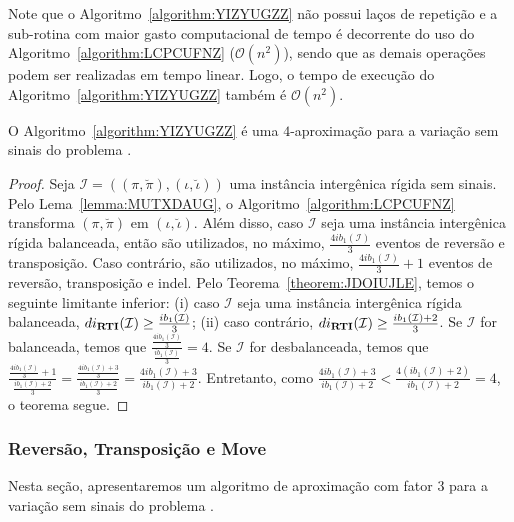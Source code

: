 Note que o Algoritmo~\ref{algorithm:YIZYUGZZ} não possui laços de repetição e a sub-rotina com maior gasto computacional de tempo é decorrente do uso do Algoritmo~\ref{algorithm:LCPCUFNZ} ($\mathcal{O}(n^2)$), sendo que as demais operações podem ser realizadas em tempo linear. Logo, o tempo de execução do Algoritmo~\ref{algorithm:YIZYUGZZ} também é $\mathcal{O}(n^2)$.

\begin{theorem}\label{theorem:ZEIGUWRR}
O Algoritmo~\ref{algorithm:YIZYUGZZ} é uma $4$-aproximação para a variação sem sinais do problema \SbIRTI{}.
\end{theorem}
\begin{proof}
Seja $\mathcal{I} = ((\pi,\breve\pi),(\iota,\breve\iota))$ uma instância intergênica rígida sem sinais. Pelo Lema~\ref{lemma:MUTXDAUG}, o Algoritmo~\ref{algorithm:LCPCUFNZ} transforma $(\pi,\breve\pi)$ em $(\iota,\breve\iota)$. Além disso, caso $\mathcal{I}$ seja uma instância intergênica rígida balanceada, então são utilizados, no máximo, $\frac{4ib_1(\mathcal{I})}{3}$ eventos de reversão e transposição. Caso contrário, são utilizados, no máximo, $\frac{4ib_1(\mathcal{I})}{3} + 1$ eventos de reversão, transposição e indel. Pelo Teorema~\ref{theorem:JDOIUJLE}, temos o seguinte limitante inferior: (i) caso $\mathcal{I}$ seja uma instância intergênica rígida balanceada, $di_{\textbf{RTI}}(\mathcal{I}) \ge \frac{ib_1(\mathcal{I})}{3}$; (ii) caso contrário, $di_{\textbf{RTI}}(\mathcal{I}) \ge \frac{ib_1(\mathcal{I}) + 2}{3}$. Se $\mathcal{I}$ for balanceada, temos que $\frac{\frac{4ib_1(\mathcal{I})}{3}}{\frac{ib_1(\mathcal{I})}{3}}=4$. Se $\mathcal{I}$ for desbalanceada,  temos que $\frac{\frac{4ib_1(\mathcal{I})}{3} + 1}{\frac{ib_1(\mathcal{I}) + 2}{3}}=\frac{\frac{4ib_1(\mathcal{I})+3}{3}}{\frac{ib_1(\mathcal{I}) + 2}{3}}=\frac{4ib_1(\mathcal{I})+3}{ib_1(\mathcal{I})+2}$. Entretanto, como $\frac{4ib_1(\mathcal{I})+3}{ib_1(\mathcal{I})+2}<\frac{4(ib_1(\mathcal{I})+2)}{ib_1(\mathcal{I})+2}=4$, o teorema segue.
\end{proof}

\subsubsection{Reversão, Transposição e Move}

Nesta seção, apresentaremos um algoritmo de aproximação com fator $3$ para a variação sem sinais do problema \SbIRTM{}. 

